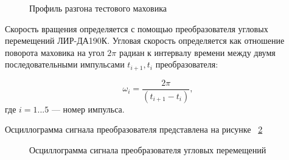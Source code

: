 \begin{figure}[!h] 
	\caption{Профиль разгона тестового маховика}
	\label{fig:flyweel_speed} 
\end{figure}



Скорость вращения определяется с помощью преобразователя угловых перемещений ЛИР-ДА190К. Угловая скорость определяется как отношение поворота маховика на угол $2\pi$ радиан к интервалу времени между двумя последовательными импульсами $t_{i+1}, t_i$ преобразователя: 

\begin{equation}
	\label{eq:flyweel_spd}
	\omega_i=\frac{2 \pi}{(t_{i+1}-t_i)},
\end{equation}
где \(i=1...5\) --- номер импульса.

Осциллограмма сигнала преобразователя представлена на рисунке ~\cref{fig:encoder}


\begin{figure}[!h] 
	\caption{Осциллограмма сигнала преобразователя угловых перемещений}
	\label{fig:encoder} 
\end{figure}

